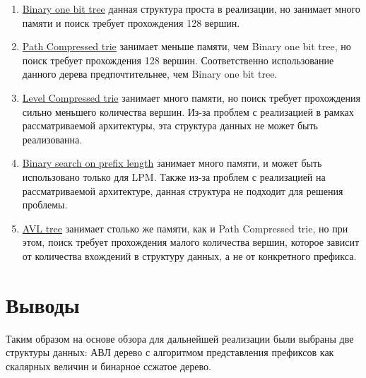 \documentclass[a4peper, 12pt, titlepage, finall]{report}
\begin{document}
        \begin{enumerate}
            \item \underline{Binary one bit tree} данная структура проста в реализации, но занимает много памяти и поиск требует прохождения 128 вершин.
            \item \underline{Path Compressed trie} занимает меньше памяти, чем Binary one bit tree, но поиск требует прохождения 128 вершин. 
                Соответственно использование данного дерева предпочтительнее, чем Binary one bit tree.
            \item \underline{Level Compressed trie} занимает много памяти, но поиск требует прохождения сильно меньшего количества вершин. 
                Из-за проблем с реализацией в рамках рассматриваемой архитектуры, эта структура данных не может быть реализованна.
            \item \underline{Binary search on prefix length} занимает много памяти, и может быть использовано только для LPM\@.
                Также из-за проблем с реализацией на рассматриваемой архитектуре, данная структура не подходит для решения проблемы.
            \item \underline{AVL tree} занимает столько же памяти, как и Path Compressed trie, но при этом, поиск требует прохождения малого количества вершин,
                которое зависит от количества вхождений в структуру данных, а не от конкретного префикса.
        \end{enumerate}

    \section{Выводы}
        Таким образом на основе обзора для дальнейшей реализации были выбраны две структуры данных: АВЛ дерево с алгоритмом представления префиксов как скалярных величин и бинарное ссжатое дерево.

        \printbibliography{}
\end{document}

